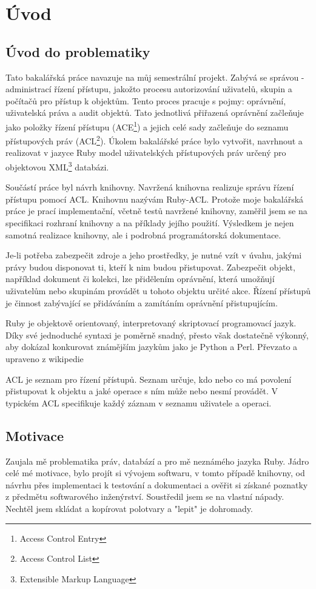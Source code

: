 \chapter{Úvod}

\section{Úvod do problematiky}

Tato bakalářská práce navazuje na můj semestrální projekt. Zabývá se správou - administrací řízení přístupu, jakožto procesu autorizování uživatelů, skupin a počítačů pro přístup k objektům. Tento proces pracuje s pojmy: oprávnění, uživatelská práva a audit objektů. Tato jednotlivá přiřazená oprávnění začleňuje jako položky řízení přístupu (ACE\footnote{Access Control Entry}) a jejich celé sady začleňuje do seznamu přístupových práv (ACL\footnote{Access Control List}). Úkolem bakalářské práce bylo vytvořit, navrhnout a realizovat v jazyce Ruby model uživatelských přístupových práv určený pro objektovou XML\footnote{Extensible Markup Language} databázi.

Součástí práce byl návrh knihovny. Navržená knihovna realizuje správu řízení přístupu pomocí ACL. Knihovnu nazývám Ruby-ACL. Protože moje bakalářská práce je prací implementační, včetně testů navržené knihovny, zaměřil jsem se na specifikaci rozhraní knihovny a na příklady jejího použití. Výsledkem je nejen samotná realizace knihovny, ale i podrobná programátorská dokumentace.

Je-li potřeba zabezpečit zdroje a jeho prostředky, je nutné vzít v úvahu, jakými právy budou disponovat ti, kteří k nim budou přistupovat. Zabezpečit objekt, například dokument či kolekci, lze přidělením oprávnění, která umožňují uživatelům nebo skupinám provádět u tohoto objektu určité akce. Řízení přístupů je činnost zabývající se přidáváním a zamítáním oprávnění přistupujícím.

Ruby je objektově orientovaný, interpretovaný skriptovací programovací jazyk. Díky své jednoduché syntaxi je poměrně snadný, přesto však dostatečně výkonný, aby dokázal konkurovat známějším jazykům jako je Python a Perl. Převzato a upraveno z wikipedie\cite{wiki:Ruby}

ACL je seznam pro řízení přístupů. Seznam určuje, kdo nebo co má povolení přistupovat k objektu a jaké operace s ním může nebo nesmí provádět. V typickém ACL specifikuje každý záznam v seznamu uživatele a operaci\cite{wiki:acl}.


\section{Motivace}
Zaujala mě problematika práv, databází a pro mě neznámého jazyka Ruby.
Jádro celé mé motivace, bylo projít si vývojem softwaru, v tomto případě knihovny, od návrhu přes implementaci k testování a dokumentaci a ověřit si získané poznatky z předmětu softwarového inženýrství. Soustředil jsem se na vlastní nápady. Nechtěl jsem skládat a kopírovat polotvary a "lepit" je dohromady.